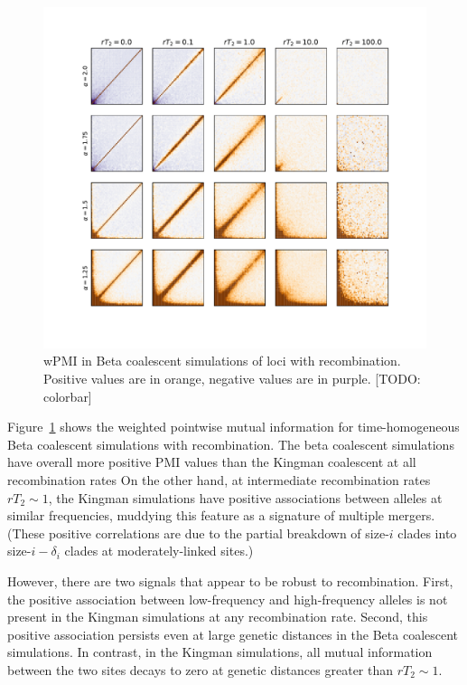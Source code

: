 \documentclass[11pt, letterpaper]{article}   	%
\newcommand{\Fig}[1]{Figure~\ref{#1}}
\begin{document}
\begin{figure}
\centering
\includegraphics[width=\textwidth]{figures/wpmi_beta_r.pdf}
\caption{wPMI in Beta coalescent simulations of loci with recombination. Positive values are in orange, negative values are in purple. [TODO: colorbar]\label{fig:wpmi_beta_r}}
\end{figure}

\Fig{fig:wpmi_beta_r} shows the weighted pointwise mutual information for time-homogeneous Beta coalescent simulations with recombination.
The beta coalescent simulations have overall more positive PMI values than the Kingman coalescent at all recombination rates
On the other hand, at intermediate recombination rates $rT_2 \sim 1$, the Kingman simulations have positive associations between alleles at similar frequencies, muddying this feature as a signature of multiple mergers.
(These positive correlations are due to the partial breakdown of size-$i$ clades into size-$i-\delta_i$ clades at moderately-linked sites.)

However, there are two signals that appear to be robust to recombination.
First, the positive association between low-frequency and high-frequency alleles is not present in the Kingman simulations at any recombination rate.
Second, this positive association persists even at large genetic distances in the Beta coalescent simulations.
In contrast, in the Kingman simulations, all mutual information between the two sites decays to zero at genetic distances greater than $rT_2 \sim 1$.
\end{document}
